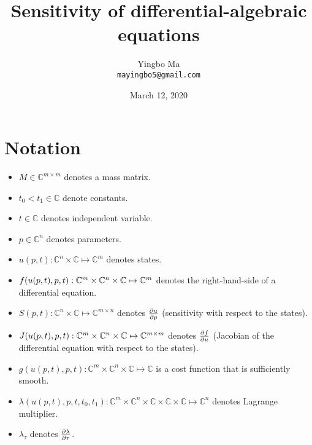 \documentclass[a4paper,9pt]{article}
\theoremstyle{definition}
\theoremstyle{remark}
\begin{document}
\author{Yingbo Ma\\
        \tt{mayingbo5@gmail.com}}
\title{Sensitivity of differential-algebraic equations}
\date{March 12, 2020}

\maketitle

\section{Notation}
\begin{itemize}
  \item $M \in \mathbb{C}^{m\times m}$ denotes a mass matrix.

  \item $t_0 < t_1\in \mathbb{C}$ denote constants.

  \item $t \in \mathbb{C}$ denotes independent variable.

  \item $p\in \mathbb{C}^n$ denotes parameters.

  \item $u(p, t): \mathbb{C}^n \times \mathbb{C}\mapsto \mathbb{C}^m$ denotes
    states.

  \item $f\qty(u(p, t), p, t): \mathbb{C}^m \times \mathbb{C}^n \times
    \mathbb{C}\mapsto \mathbb{C}^{m}$ denotes the right-hand-side of a
    differential equation.

  \item $S(p, t): \mathbb{C}^n \times \mathbb{C}\mapsto \mathbb{C}^{m\times n}$
    denotes $\pdv{u}{p}$ (sensitivity with respect to the states).

  \item $J\qty(u(p, t), p, t): \mathbb{C}^m \times \mathbb{C}^n \times
    \mathbb{C} \mapsto \mathbb{C}^{m\times m}$ denotes $\pdv{f}{u}$ (Jacobian of
    the differential equation with respect to the states).

  \item $g(u(p, t), p, t): \mathbb{C}^m \times \mathbb{C}^n \times \mathbb{C}
    \mapsto \mathbb{C}$ is a cost function that is sufficiently smooth.

  \item $\lambda(u(p, t), p, t, t_0, t_1): \mathbb{C}^m \times \mathbb{C}^n
    \times \mathbb{C}\times \mathbb{C}\times \mathbb{C} \mapsto \mathbb{C}^n$
    denotes Lagrange multiplier.

  \item $\lambda_\tau$ denotes $\pdv{\lambda}{\tau}$.
\end{itemize}
\end{document}
